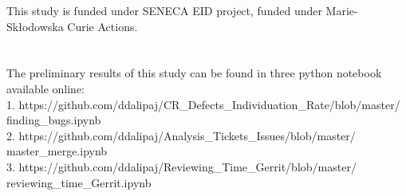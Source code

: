 \documentclass[ifip]{svmult}
\begin{document}
This study is funded under SENECA EID project, funded under Marie-Skłodowska Curie Actions.
\\
\\
\\
The preliminary results of this study can be found in three python notebook available online:
\\
1. https://github.com/ddalipaj/CR\_Defects\_Individuation\_Rate/blob/master/
\\
finding\_bugs.ipynb
\\
2. https://github.com/ddalipaj/Analysis\_Tickets\_Issues/blob/master/
\\
master\_merge.ipynb
\\
3. https://github.com/ddalipaj/Reviewing\_Time\_Gerrit/blob/master/
\\
reviewing\_time\_Gerrit.ipynb
\\
\pagebreak

















\end{document}
